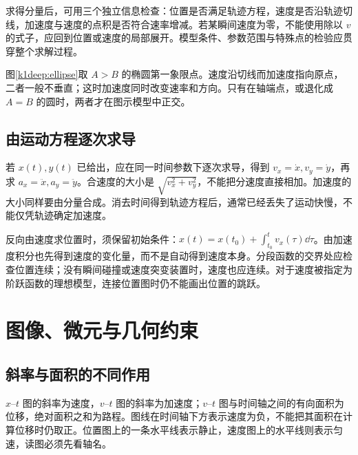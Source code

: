 求得分量后，可用三个独立信息检查：位置是否满足轨迹方程，速度是否沿轨迹切线，加速度与速度的点积是否符合速率增减。若某瞬间速度为零，不能使用除以 $v$的式子，应回到位置或速度的局部展开。模型条件、参数范围与特殊点的检验应贯穿整个求解过程。



图\ref{k1deep:ellipse}取 $A>B$ 的椭圆第一象限点。速度沿切线而加速度指向原点，二者一般不垂直；这时加速度同时改变速率和方向。只有在轴端点，或退化成 $A=B$ 的圆时，两者才在图示模型中正交。


\subsection{由运动方程逐次求导}
若 $x(t),y(t)$ 已给出，应在同一时间参数下逐次求导，得到 $v_x=\dot x,v_y=\dot y$，再求 $a_x=\ddot x,a_y=\ddot y$。合速度的大小是 $\sqrt{v_x^2+v_y^2}$，不能把分速度直接相加。加速度的大小同样要由分量合成。消去时间得到轨迹方程后，通常已经丢失了运动快慢，不能仅凭轨迹确定加速度。

反向由速度求位置时，须保留初始条件：$x(t)=x(t_0)+\int_{t_0}^{t}v_x(\tau)\dd\tau$。由加速度积分也先得到速度的变化量，而不是自动得到速度本身。分段函数的交界处应检查位置连续；没有瞬间碰撞或速度突变装置时，速度也应连续。对于速度被指定为阶跃函数的理想模型，连接位置图时仍不能画出位置的跳跃。

\section{图像、微元与几何约束}
\subsection{斜率与面积的不同作用}
$x$--$t$ 图的斜率为速度，$v$--$t$ 图的斜率为加速度；$v$--$t$ 图与时间轴之间的有向面积为位移，绝对面积之和为路程。图线在时间轴下方表示速度为负，不能把其面积在计算位移时仍取正。位置图上的一条水平线表示静止，速度图上的水平线则表示匀速，读图必须先看轴名。


